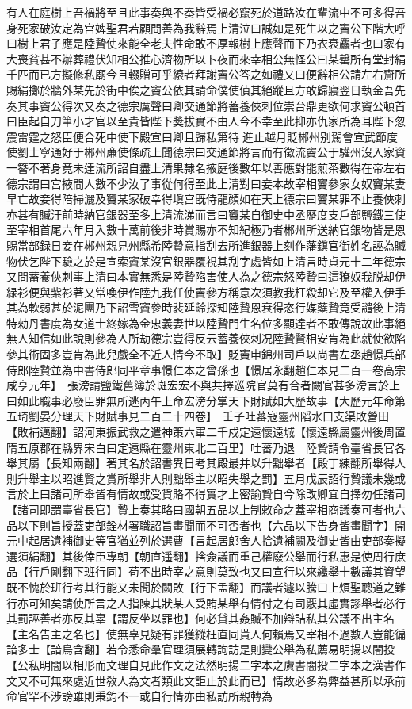 有人在庭樹上吾禍將至且此事奏與不奏皆受禍必竄死於道路汝在輩流中不可多得吾身死家破汝定為宫婢聖君若顧問善為我辭焉上清泣曰誠如是死生以之竇公下階大呼曰樹上君子應是陸贄使來能全老夫性命敢不厚報樹上應聲而下乃衣衰麤者也曰家有大喪貧甚不辦葬禮伏知相公推心濟物所以卜夜而來幸相公無怪公曰某罄所有堂封絹千匹而已方擬修私廟今且輟贈可乎縗者拜謝竇公答之如禮又曰便辭相公請左右齎所賜絹擲於牆外某先於街中俟之竇公依其請命僕使偵其絕蹤且方敢歸寢翌日執金吾先奏其事竇公得次又奏之德宗厲聲曰卿交通節將蓄養俠刺位崇台鼎更欲何求竇公頓首曰臣起自刀筆小才官以至貴皆陛下奬拔實不由人今不幸至此抑亦仇家所為耳陛下忽震雷霆之怒臣便合死中使下殿宣曰卿且歸私第待進止越月貶郴州别駕會宣武節度使劉士寧通好于郴州亷使條疏上聞德宗曰交通節將言而有徵流竇公于驩州沒入家資一簪不著身竟未逹流所詔自盡上清果隸名掖庭後數年以善應對能煎茶數得在帝左右德宗謂曰宫掖間人數不少汝了事從何得至此上清對曰妾本故宰相竇參家女奴竇某妻早亡故妾得陪掃灑及竇某家破幸得塡宫旣侍龍顔如在天上德宗曰竇某罪不止養俠刺亦甚有贓汙前時納官銀器至多上清流涕而言曰竇某自御史中丞歷度支戶部鹽鐵三使至宰相首尾六年月入數十萬前後非時賞賜亦不知紀極乃者郴州所送納官銀物皆是恩賜當部録日妾在郴州親見州縣希陸䞇意指刮去所進銀器上刻作藩鎭官衘姓名誣為贓物伏乞陛下驗之於是宣索竇某沒官銀器覆視其刮字處皆如上清言時貞元十二年德宗又問蓄養俠刺事上清曰本實無悉是陸贄陷害使人為之德宗怒陸贄曰這獠奴我脱却伊緑衫便與紫衫著又常喚伊作陸九我任使竇參方稱意次須教我枉殺却它及至權入伊手其為軟弱甚於泥團乃下詔雪竇參時裴延齡探知陸贄恩衰得恣行媒糵贄竟受譴後上清特勑丹書度為女道士終嫁為金忠義妻世以陸贄門生名位多顯達者不敢傳說故此事絕無人知信如此說則參為人所劫德宗豈得反云蓄養俠刺况陸贄賢相安肯為此就使欲陷參其術固多豈肯為此兒戲全不近人情今不取】貶竇申錦州司戶以尚書左丞趙憬兵部侍郎陸贄並為中書侍郎同平章事憬仁本之曾孫也【憬居永翻趙仁本見二百一卷高宗咸亨元年】　張滂請鹽鐵舊簿於斑宏宏不與共擇巡院官莫有合者闕官甚多滂言於上曰如此職事必廢臣罪無所逃丙午上命宏滂分掌天下財賦如大歷故事【大歷元年命第五琦劉晏分理天下財賦事見二百二十四卷】　壬子吐蕃寇靈州䧟水口支渠敗營田【敗補邁翻】詔河東振武救之遣神策六軍二千戍定遠懷遠城【懷遠縣屬靈州後周置隋五原郡在縣界宋白曰定遠縣在靈州東北二百里】吐蕃乃退　陸贄請令臺省長官各舉其屬【長知兩翻】著其名於詔書異日考其殿最并以升黜舉者【殿丁練翻所舉得人則升舉主以昭進賢之賞所舉非人則黜舉主以昭失舉之罰】五月戊辰詔行贄議未幾或言於上曰諸司所舉皆有情故或受貨賂不得實才上密諭贄自今除改卿宜自擇勿任諸司【諸司即謂臺省長官】贄上奏其略曰國朝五品以上制敕命之蓋宰相商議奏可者也六品以下則旨授蓋吏部銓材署職詔旨畫聞而不可否者也【六品以下告身皆畫聞字】開元中起居遺補御史等官猶並列於選曹【言起居郎舍人拾遺補闕及御史皆由吏部奏擬選須絹翻】其後倖臣專朝【朝直遥翻】捨僉議而重己權廢公舉而行私惠是使周行庶品【行戶剛翻下班行同】苟不出時宰之意則莫致也又曰宣行以來纔舉十數議其資望既不愧於班行考其行能又未聞於闕敗【行下孟翻】而議者遽以騰口上煩聖聰道之難行亦可知矣請使所言之人指陳其狀某人受賄某舉有情付之有司覈其虛實謬舉者必行其罰誣善者亦反其辜【謂反坐以罪也】何必貸其姦贓不加辯詰私其公議不出主名【主名告主之名也】使無辜見疑有罪獲縱枉直同貰人何賴焉又宰相不過數人豈能徧諳多士【諳烏含翻】若令悉命羣官理須展轉詢訪是則變公舉為私薦易明揚以闇投【公私明闇以相形而文理自見此作文之法然明揚二字本之虞書闇投二字本之漢書作文又不可無來處近世敎人為文者類此文詎止於此而已】情故必多為弊益甚所以承前命官罕不涉謗雖則秉鈞不一或自行情亦由私訪所親轉為
